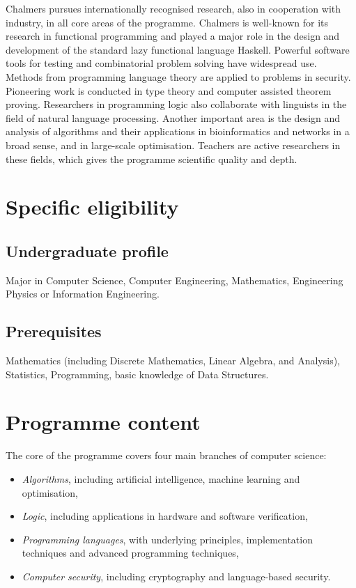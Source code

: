 \documentclass[twocolumn]{article}
\begin{document}
Chalmers pursues internationally recognised research,
also in cooperation with industry, in all core areas of the
programme. Chalmers is well-known for its research in functional
programming and played a major role in the design and development of
the standard lazy functional language Haskell. Powerful software tools
for testing and combinatorial problem solving have widespread
use. Methods from programming language theory are applied to problems
in security. Pioneering work is conducted in type theory and computer
assisted theorem proving. Researchers in programming logic also
collaborate with linguists in the field of natural language
processing. Another important area is the design and analysis of
algorithms and their applications in bioinformatics and networks in a
broad sense, and in large-scale optimisation.  Teachers are active
researchers in these fields, which gives the programme scientific
quality and depth.

\section{Specific eligibility}
\subsection{Undergraduate profile}

Major in Computer Science, Computer Engineering, Mathematics,
Engineering Physics or Information Engineering.

\subsection{Prerequisites}

Mathematics (including Discrete Mathematics, Linear Algebra, and
Analysis), Statistics, Programming, basic knowledge of Data
Structures.

\section{Programme content}

The core of the programme covers four main branches of computer science:
\begin{itemize}
\item {\em Algorithms}, including artificial intelligence, machine
  learning and optimisation,
\item {\em Logic}, including applications in hardware and software
  verification,
\item {\em Programming languages}, with underlying principles,
  implementation techniques and advanced programming techniques,
\item {\em Computer security}, including cryptography and
  language-based security.
\end{itemize}
\end{document}
